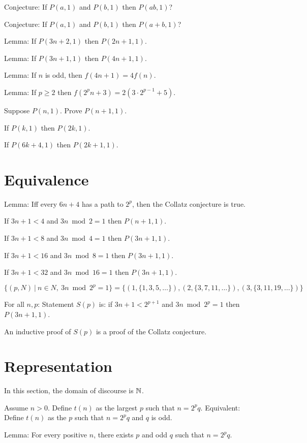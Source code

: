 Conjecture: If \(P(a,1)\) and \(P(b,1)\) then \(P(ab,1)\)?

Conjecture: If \(P(a,1)\) and \(P(b,1)\) then \(P(a+b,1)\)?

Lemma: If \(P(3n+2,1)\) then \(P(2n+1,1)\).

Lemma: If \(P(3n+1,1)\) then \(P(4n+1,1)\).

Lemma: If \(n\) is odd, then \(f(4n+1) = 4f(n)\).

Lemma: If \(p \ge 2\) then \(f(2^p n + 3) = 2(3 \cdot 2^{p-1} + 5)\).

Suppose \(P(n,1)\). Prove \(P(n+1,1)\).

If \(P(k,1)\) then \(P(2k,1)\).

If \(P(6k+4,1)\) then \(P(2k+1,1)\).

\section{Equivalence}

Lemma: Iff every \(6n+4\) has a path to \(2^p\), then the Collatz conjecture is true.

If \(3n+1 < 4\) and \(3n \bmod 2 = 1\) then \(P(n+1,1)\).

If \(3n+1 < 8\) and \(3n \bmod 4 = 1\) then \(P(3n+1,1)\).

If \(3n+1 < 16\) and \(3n \bmod 8 = 1\) then \(P(3n+1,1)\).

If \(3n+1 < 32\) and \(3n \bmod 16 = 1\) then \(P(3n+1,1)\).

\(\{ (p,N) ~|~ n \in N, ~ 3n \bmod 2^p = 1 \} = \{ (1,\{1,3,5,\ldots\}), (2,\{3,7,11,\ldots\}), (3,\{3,11,19,\ldots\}) \}\)

For all \(n,p\): Statement \(S(p)\) is: if \(3n+1 < 2^{p+1}\) and \(3n \bmod 2^p = 1\) then \(P(3n+1,1)\).

An inductive proof of \(S(p)\) is a proof of the Collatz conjecture.

\section{Representation}

In this section, the domain of discourse is \(\mathbb{N}\).

Assume \(n > 0\).
Define \(t(n)\) as the largest \(p\) such that \(n = 2^p q\).
Equivalent:
Define \(t(n)\) as the \(p\) such that \(n = 2^p q\) and \(q\) is odd.

Lemma:
For every positive \(n\), there exists \(p\) and odd \(q\) such that \(n = 2^p q\).

